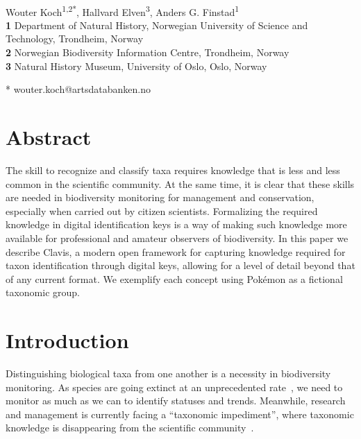 \documentclass[10pt,letterpaper]{article}
\begin{document}
\vspace*{0.2in}

\begin{flushleft}
{\Large
\textbf{}
}
\newline
\\
Wouter Koch\textsuperscript{1,2*},
Hallvard Elven\textsuperscript{3},
Anders G. Finstad\textsuperscript{1}
\\
\bigskip
\textbf{1} Department of Natural History, Norwegian University of Science and Technology, Trondheim, Norway
\\
\textbf{2} Norwegian Biodiversity Information Centre, Trondheim, Norway
\\
\textbf{3} Natural History Museum, University of Oslo, Oslo, Norway
\\
\bigskip

* wouter.koch@artsdatabanken.no

\end{flushleft}
\section*{
Abstract
}
The skill to recognize and classify taxa requires knowledge that is less and less common in the scientific community. At the same time, it is clear that these skills are needed in biodiversity monitoring for management and conservation, especially when carried out by citizen scientists. Formalizing the required knowledge in digital identification keys is a way of making such knowledge more available for professional and amateur observers of biodiversity. In this paper we describe Clavis, a modern open framework for capturing knowledge required for taxon identification through digital keys, allowing for a level of detail beyond that of any current format. We exemplify each concept using Pokémon as a fictional taxonomic group.
\linenumbers
\section*{
Introduction
}
Distinguishing biological taxa from one another is a necessity in biodiversity monitoring. As species are going extinct at an unprecedented rate~\cite{Ceballos2015, Johnson2017}, we need to monitor as much as we can to identify statuses and trends. Meanwhile, research and management is currently facing a ``taxonomic impediment'', where taxonomic knowledge is disappearing from the scientific community~\cite{Engel2021}.
\end{document}
